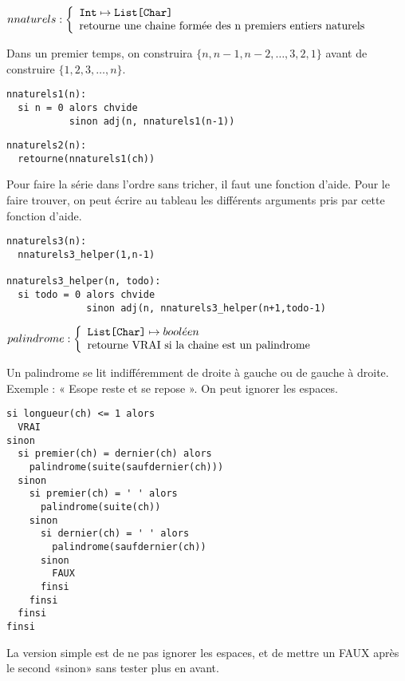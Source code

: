 \documentclass[10pt]{article}\usepackage[nu]{esial}
\begin{document}
\begin{Question}
  $nnaturels: \left\{
    \begin{array}{l}
      \text{\texttt{Int}}\mapsto \text{\texttt{List[Char]}}\\
      \text{retourne une chaine formée des n premiers entiers naturels}
    \end{array}\right.$  
  
  Dans un premier temps, on construira $\{n, n-1, n-2, \ldots, 3, 2, 1\}$ avant
  de construire $\{1, 2, 3, \ldots, n\}$.
\end{Question}
\begin{Reponse}
  \begin{Verbatim}[label=Version simple qui donne la liste à l'envers]
nnaturels1(n):
  si n = 0 alors chvide
           sinon adj(n, nnaturels1(n-1))
  \end{Verbatim}

  \begin{Verbatim}[label=Version trichée qui donne la chaine à l'endroit:]
nnaturels2(n):
  retourne(nnaturels1(ch))
  \end{Verbatim}
  
  Pour faire la série dans l'ordre sans tricher, il faut une fonction
  d'aide. Pour le faire trouver, on peut écrire au tableau les différents
  arguments pris par cette fonction d'aide.
  \begin{Verbatim}[label=Version avec helper:]
nnaturels3(n):
  nnaturels3_helper(1,n-1)    

nnaturels3_helper(n, todo):
  si todo = 0 alors chvide
              sinon adj(n, nnaturels3_helper(n+1,todo-1)
  \end{Verbatim}
\end{Reponse}


\begin{Question}
  $palindrome: \left\{
    \begin{array}{l}
      \text{\texttt{List[Char]}}\mapsto bool\acute{e}en\\
      \text{retourne VRAI si la chaine est un palindrome}
    \end{array}\right.$  

  Un palindrome se lit indifféremment de droite à gauche ou de gauche à droite.
  Exemple : « Esope reste et se repose ». On peut ignorer les espaces.
\end{Question}
\begin{Reponse}
  \begin{Verbatim}[label=palindrome(ch)]
si longueur(ch) <= 1 alors 
  VRAI
sinon
  si premier(ch) = dernier(ch) alors
    palindrome(suite(saufdernier(ch)))
  sinon 
    si premier(ch) = ' ' alors
      palindrome(suite(ch))
    sinon 
      si dernier(ch) = ' ' alors
        palindrome(saufdernier(ch))
      sinon
        FAUX
      finsi
    finsi    
  finsi
finsi    
  \end{Verbatim}
  La version simple est de ne pas ignorer les espaces, et de
  mettre un FAUX après le second «sinon» sans tester plus en avant.
\end{Reponse}
\end{document}
